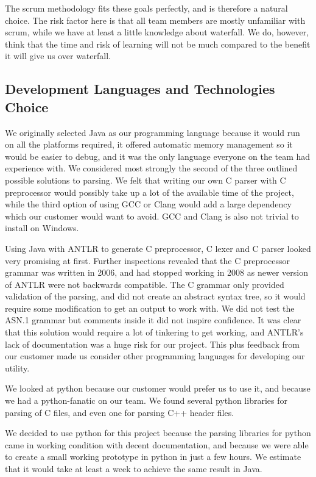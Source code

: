 The scrum methodology fits these goals perfectly, and is therefore a natural
choice. The risk factor here is that all team members are mostly unfamiliar
with scrum, while we have at least a little knowledge about waterfall. We do,
however, think that the time and risk of learning will not be much compared to
the benefit it will give us over waterfall.

\subsection{Development Languages and Technologies Choice}
We originally selected Java as our programming language because it would run on
all the platforms required, it offered automatic memory management so it would
be easier to debug, and it was the only language everyone on the team had
experience with. We considered most strongly the second of the three outlined
possible solutions to parsing. We felt that writing our own C parser with C
preprocessor would possibly take up a lot of the available time of the project,
while the third option of using GCC or Clang would add a large dependency which
our customer would want to avoid. GCC and Clang is also not trivial to install
on Windows.

Using Java with ANTLR to generate C preprocessor, C lexer and C parser looked
very promising at first. Further inspections revealed that the C preprocessor
grammar was written in 2006, and had stopped working in 2008 as newer version
of ANTLR were not backwards compatible. The C grammar only provided validation
of the parsing, and did not create an abstract syntax tree, so it would require
some modification to get an output to work with. We did not test the ASN.1
grammar but comments inside it did not inspire confidence. It was clear that
this solution would require a lot of tinkering to get working, and ANTLR’s lack
of documentation was a huge risk for our project. This plus feedback from our
customer made us consider other programming languages for developing our
utility.

We looked at python because our customer would prefer us to use it, and because
we had a python-fanatic on our team. We found several python libraries for
parsing of C files, and even one for parsing C++ header files.

We decided to use python for this project because the parsing libraries for
python came in working condition with decent documentation, and because we
were able to create a small working prototype in python in just a few hours.
We estimate that it would take at least a week to achieve the same result in
Java.


